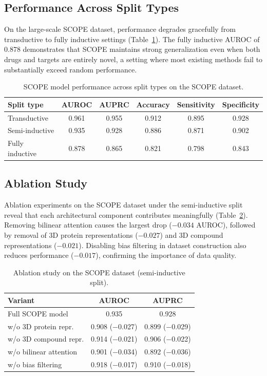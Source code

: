 \documentclass[11pt]{article}
\begin{document}
\subsection{Performance Across Split Types}

On the large-scale SCOPE dataset, performance degrades gracefully from transductive to fully inductive settings (Table~\ref{tab:splits}). The fully inductive AUROC of 0.878 demonstrates that SCOPE maintains strong generalization even when both drugs and targets are entirely novel, a setting where most existing methods fail to substantially exceed random performance.

\begin{table}[h]
\centering
\caption{SCOPE model performance across split types on the SCOPE dataset.}
\label{tab:splits}
\begin{tabular}{lccccc}
\toprule
Split type & AUROC & AUPRC & Accuracy & Sensitivity & Specificity \\
\midrule
Transductive & 0.961 & 0.955 & 0.912 & 0.895 & 0.928 \\
Semi-inductive & 0.935 & 0.928 & 0.886 & 0.871 & 0.902 \\
Fully inductive & 0.878 & 0.865 & 0.821 & 0.798 & 0.843 \\
\bottomrule
\end{tabular}
\end{table}

\subsection{Ablation Study}

Ablation experiments on the SCOPE dataset under the semi-inductive split reveal that each architectural component contributes meaningfully (Table~\ref{tab:ablation}). Removing bilinear attention causes the largest drop ($-0.034$ AUROC), followed by removal of 3D protein representations ($-0.027$) and 3D compound representations ($-0.021$). Disabling bias filtering in dataset construction also reduces performance ($-0.017$), confirming the importance of data quality.

\begin{table}[h]
\centering
\caption{Ablation study on the SCOPE dataset (semi-inductive split).}
\label{tab:ablation}
\begin{tabular}{lcc}
\toprule
Variant & AUROC & AUPRC \\
\midrule
Full SCOPE model & 0.935 & 0.928 \\
w/o 3D protein repr. & 0.908 ($-$0.027) & 0.899 ($-$0.029) \\
w/o 3D compound repr. & 0.914 ($-$0.021) & 0.906 ($-$0.022) \\
w/o bilinear attention & 0.901 ($-$0.034) & 0.892 ($-$0.036) \\
w/o bias filtering & 0.918 ($-$0.017) & 0.910 ($-$0.018) \\
\bottomrule
\end{tabular}
\end{table}
\end{document}
